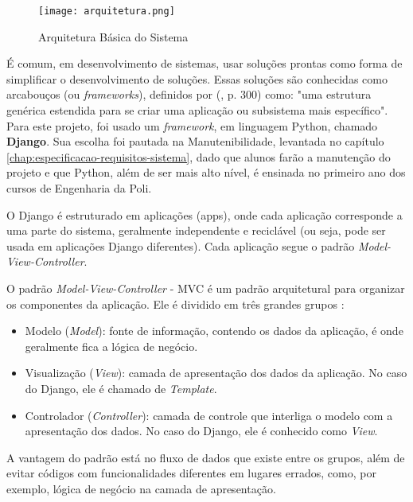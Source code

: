 \begin{figure}[H]
    \centering
    \texttt{[image: arquitetura.png]}
    \caption{Arquitetura Básica do Sistema}
    \label{fig:arch}
\end{figure}

É comum, em desenvolvimento de sistemas, usar soluções prontas como forma de simplificar o desenvolvimento de soluções. Essas soluções são conhecidas como arcabouços (ou \textit{frameworks}), definidos por  (\citeyear{iansommerville2011}, p. 300) como: "uma estrutura genérica estendida para se criar uma aplicação ou subsistema mais específico". Para este projeto, foi usado um \textit{framework}, em linguagem Python, chamado \textbf{Django}. Sua escolha foi pautada na Manutenibilidade, levantada no capítulo \ref{chap:especificacao-requisitos-sistema}, dado que alunos farão a manutenção do projeto e que Python, além de ser mais alto nível, é ensinada no primeiro ano dos cursos de Engenharia da Poli.

O Django é estruturado em aplicações (apps), onde cada aplicação corresponde a uma parte do sistema, geralmente independente e reciclável (ou seja, pode ser usada em aplicações Django diferentes). Cada aplicação segue o padrão \textit{Model-View-Controller}.

O padrão \textit{Model-View-Controller} - MVC é um padrão arquitetural para organizar os componentes da aplicação. Ele é dividido em três grandes grupos \cite{thedjangobook2018}:

\begin{itemize}
    \item Modelo (\textit{Model}): fonte de informação, contendo os dados da aplicação, é onde geralmente fica a lógica de negócio.
    \item Visualização (\textit{View}): camada de apresentação dos dados da aplicação. No caso do Django, ele é chamado de \textit{Template}.
    \item Controlador (\textit{Controller}): camada de controle que interliga o modelo com a apresentação dos dados. No caso do Django, ele é conhecido como \textit{View}.
\end{itemize}

A vantagem do padrão está no fluxo de dados que existe entre os grupos, além de evitar códigos com funcionalidades diferentes em lugares errados, como, por exemplo, lógica de negócio na camada de apresentação.

